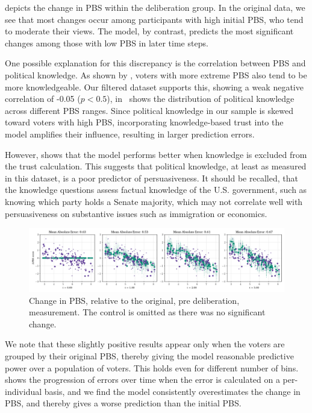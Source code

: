  depicts the change in PBS within the deliberation
group. In the original data, we see that most changes occur among participants
with high initial PBS, who tend to moderate their views. The model, by
contrast, predicts the most significant changes among those with low PBS in
later time steps.

One possible explanation for this discrepancy is the correlation between PBS
and political knowledge. As shown by \citet{fishkinCanDeliberationHave2024},
voters with more extreme PBS also tend to be more knowledgeable. Our
filtered dataset supports this, showing a weak negative correlation of -0.05
($p < 0.5$),  in~
shows the distribution of political knowledge across different PBS ranges.
Since political knowledge in our sample is skewed toward voters with high PBS,
incorporating knowledge-based trust into the model amplifies their influence,
resulting in larger prediction errors.

However,  shows that the model performs better when
knowledge is excluded from the trust calculation. This suggests that political
knowledge, at least as measured in this dataset, is a poor predictor of
persuasiveness. It should be recalled, that the knowledge questions assess factual
knowledge of the U.S. government, such as knowing which party holds a
Senate majority, which may not correlate well with persuasiveness on substantive
issues such as immigration or economics.


\begin{figure}[ht]
	\begin{center}
		\includegraphics[width=\textwidth]{Figures/change_pbs_scores.png}
	\end{center}
	\caption{Change in  PBS, relative to the original, pre deliberation, measurement. The control is  omitted as there was no significant change.}\label{fig:delta_pbs}
\end{figure}


We note that these slightly positive results appear only when the voters are
grouped by their original PBS, thereby giving the model reasonable predictive
power over a population of voters.  This holds even for different number of
bins.  shows the progression of errors over time when
the error is calculated on a per-individual basis, and we find the model
consistently overestimates the change in PBS, and thereby gives a worse
prediction than the initial PBS.

